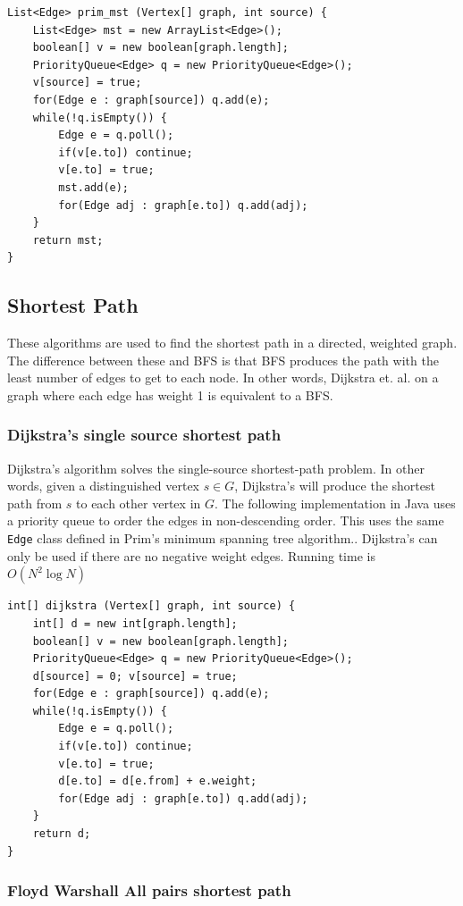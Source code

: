 \documentclass[a4paper,12pt]{article}
\begin{document}
\begin{lstlisting}
List<Edge> prim_mst (Vertex[] graph, int source) {
	List<Edge> mst = new ArrayList<Edge>();
	boolean[] v = new boolean[graph.length];
	PriorityQueue<Edge> q = new PriorityQueue<Edge>();
	v[source] = true;
	for(Edge e : graph[source]) q.add(e);
	while(!q.isEmpty()) {
		Edge e = q.poll();
		if(v[e.to]) continue;
		v[e.to] = true;
		mst.add(e);
		for(Edge adj : graph[e.to]) q.add(adj);
	}
	return mst;
}
\end{lstlisting}

\subsection{Shortest Path}

These algorithms are used to find the shortest path in a directed, weighted graph. The difference between these and BFS is that BFS produces the path with the least number of edges to get to each node. In other words, Dijkstra et. al. on a graph where each edge has weight 1 is equivalent to a BFS.

\subsubsection{Dijkstra's single source shortest path}

Dijkstra's algorithm solves the single-source shortest-path problem. In other words, given a distinguished vertex $s \in G$, Dijkstra's will produce the shortest path from $s$ to each other vertex in $G$. The following implementation in Java uses a priority queue to order the edges in non-descending order. This uses the same \lstinline/Edge/ class defined in Prim's minimum spanning tree algorithm.. Dijkstra's can only be used if there are no negative weight edges. Running time is $O(N^2\log N)$


\begin{lstlisting}
int[] dijkstra (Vertex[] graph, int source) {
	int[] d = new int[graph.length];
	boolean[] v = new boolean[graph.length];
	PriorityQueue<Edge> q = new PriorityQueue<Edge>();
	d[source] = 0; v[source] = true;
	for(Edge e : graph[source]) q.add(e);
	while(!q.isEmpty()) {
		Edge e = q.poll();
		if(v[e.to]) continue;
		v[e.to] = true;
		d[e.to] = d[e.from] + e.weight;
		for(Edge adj : graph[e.to]) q.add(adj);
	}
	return d;
}
\end{lstlisting}

\subsubsection{Floyd Warshall All pairs shortest path}
\end{document}
